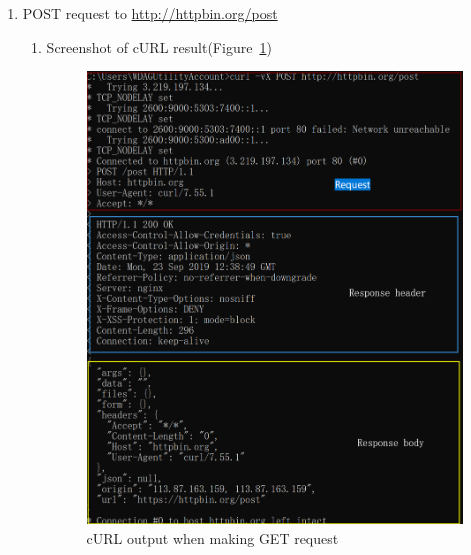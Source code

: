 \documentclass[12pt,letterpaper]{ctexart}
\begin{document}
\begin{enumerate}
\begin{enumerate}
\begin{itemize}
          \item host: httpbin.org
          \item user-agent: curl/7.55.1
        \end{itemize}
      \item Response
        \begin{itemize}
          \item status code: 200 (OK)
          \item content type: application/json
          \item server: nginx
          \item content-length: 204
          \item Others: Access-Control-Allow-Origin: * (允许跨域)
        \end{itemize}

    \end{enumerate}
  \newpage
  \item POST request to \url{http://httpbin.org/post}
  \begin{enumerate}
    \item Screenshot of cURL result(Figure~\ref{fig:post_cmd})
      \begin{figure}[H]
        \centering
        \includegraphics[width=0.8\linewidth]{assets/post_cmd.png}
        \caption{cURL output when making GET request}
        \label{fig:post_cmd}
      \end{figure}

\end{enumerate}
\end{enumerate}
\end{document}
